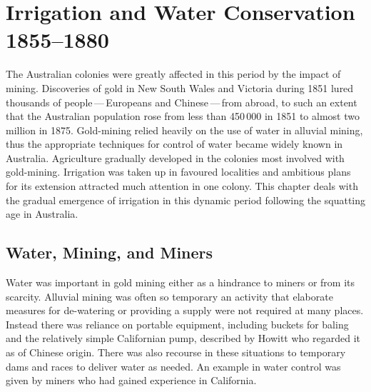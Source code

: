 
\setcounter{endnote}{0}

\chapter{Irrigation and Water Conservation 1855--1880}
\label{ch:emergence}


The Australian colonies were greatly affected in this period by the
impact of mining. Discoveries of gold in New South Wales and Victoria
during 1851 lured thousands of people\,---\,Europeans and
Chinese\,---\,from abroad, to such an extent that the Australian
population rose from less than 450\,000 in 1851 to almost two million
in 1875.  Gold-mining relied heavily on the use of water in alluvial
mining, thus the appropriate techniques for control of water became
widely known in Australia.  Agriculture gradually developed in the
colonies most involved with gold-mining.  Irrigation was taken up in
favoured localities and ambitious plans for its extension attracted
much attention in one colony.  This chapter deals with the gradual
emergence of irrigation in this dynamic period following the squatting
age in Australia.

\section*{Water, Mining, and Miners}  

Water was important in gold mining either as a hindrance to miners or
from its scarcity.  Alluvial  mining was often so
temporary an activity that elaborate measures for de-watering or
providing a supply were not required at many places.  Instead there
was reliance on portable equipment, including buckets for baling and
the relatively simple Californian pump, described by Howitt who
regarded it as of Chinese origin.  There was also recourse in these
situations to temporary dams and races to deliver water as needed.  An
example in water control was given by miners who had gained experience
in California.

